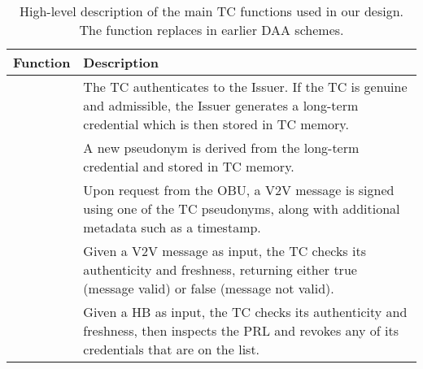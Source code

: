 \begin{table}
\renewcommand{\arraystretch}{1.5}
  \centering

    \begin{tabular}{ | c | p{5.9cm} | }
      \hline
      Function          & Description\\
    \hline
    \hline
    \funcjoin{}         & The \acs{TC} authenticates to the Issuer.
    If the \ac{TC} is genuine and admissible, the Issuer generates a long-term
    credential which is then stored in \acs{TC} memory.\\
    \hline
    \funcissue{}        & A new pseudonym is derived from the long-term
    credential and stored in \acs{TC} memory.\\
    \hline
    \funcsign{}         & Upon request from the \acs{OBU}, a \acs{V2V} message
    is signed using one of the \acs{TC} pseudonyms, along with additional
    metadata such as a timestamp.\\
    \hline
    \funcverify{}       & Given a \acs{V2V} message as input, the \acs{TC}
    checks its authenticity and freshness, returning either true (message valid)
    or false (message not valid).\\
    \hline
    \funcheartbeat{}    & Given a \acs{HB} as input, the \acs{TC} checks its
    authenticity and freshness, then inspects the \acs{PRL} and revokes any of
    its credentials that are on the list.\\
    \hline
  \end{tabular}
  \vspace{0.2cm}
  \caption{ High-level description of the main \acs{TC} functions used in our
  design. The \funcheartbeat{} function replaces \funcrevokedaa{} in earlier
  \ac{DAA} schemes. }
  \label{tbl:tc-functions}
\end{table}
%


